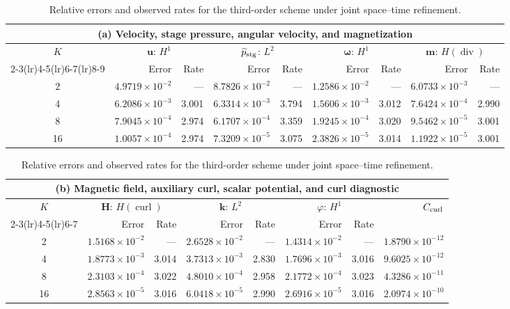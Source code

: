 \documentclass[11pt,a4paper]{article}
\newcommand{\bs}{\boldsymbol}
\DeclareMathOperator{\curl}{curl}
\DeclareMathOperator{\ddiv}{div}
\newcommand{\Div}{\ddiv}
\newcommand{\pp}{\widetilde p}
\theoremstyle{definition}
\numberwithin{equation}{section}
\begin{document}
\begin{table}[H]
\centering
\caption{Relative errors and observed rates for the third-order scheme under joint space--time refinement.}
\label{tab:third-order-errors}
\begingroup
\small
\setlength{\tabcolsep}{3.5pt}
\renewcommand{\arraystretch}{1.10}
\begin{tabular}{@{}c*{8}{r}@{}}
\toprule
\multicolumn{9}{c}{(a) Velocity, stage pressure, angular velocity, and magnetization}\\
\midrule
$K$ & \multicolumn{2}{c}{$\bs u$: $H^1$} & \multicolumn{2}{c}{$\pp_{\rm stg}$: $L^2$} & \multicolumn{2}{c}{$\bs\omega$: $H^1$} & \multicolumn{2}{c}{$\bs m$: $H(\Div)$}\\
\cmidrule(lr){2-3}\cmidrule(lr){4-5}\cmidrule(lr){6-7}\cmidrule(lr){8-9}
 & Error & Rate & Error & Rate & Error & Rate & Error & Rate\\
\midrule
2 & $4.9719\!\times\!10^{-2}$ & --- & $8.7826\!\times\!10^{-2}$ & --- & $1.2586\!\times\!10^{-2}$ & --- & $6.0733\!\times\!10^{-3}$ & ---\\
4 & $6.2086\!\times\!10^{-3}$ & 3.001 & $6.3314\!\times\!10^{-3}$ & 3.794 & $1.5606\!\times\!10^{-3}$ & 3.012 & $7.6424\!\times\!10^{-4}$ & 2.990\\
8 & $7.9045\!\times\!10^{-4}$ & 2.974 & $6.1707\!\times\!10^{-4}$ & 3.359 & $1.9245\!\times\!10^{-4}$ & 3.020 & $9.5462\!\times\!10^{-5}$ & 3.001\\
16 & $1.0057\!\times\!10^{-4}$ & 2.974 & $7.3209\!\times\!10^{-5}$ & 3.075 & $2.3826\!\times\!10^{-5}$ & 3.014 & $1.1922\!\times\!10^{-5}$ & 3.001\\
\bottomrule
\end{tabular}
\par\medskip
\begin{tabular}{@{}c*{7}{r}@{}}
\toprule
\multicolumn{8}{c}{(b) Magnetic field, auxiliary curl, scalar potential, and curl diagnostic}\\
\midrule
$K$ & \multicolumn{2}{c}{$\bs H$: $H(\curl)$} & \multicolumn{2}{c}{$\bs k$: $L^2$} & \multicolumn{2}{c}{$\varphi$: $H^1$} & $C_{\rm curl}$\\
\cmidrule(lr){2-3}\cmidrule(lr){4-5}\cmidrule(lr){6-7}
 & Error & Rate & Error & Rate & Error & Rate & \\
\midrule
2 & $1.5168\!\times\!10^{-2}$ & --- & $2.6528\!\times\!10^{-2}$ & --- & $1.4314\!\times\!10^{-2}$ & --- & $1.8790\!\times\!10^{-12}$\\
4 & $1.8773\!\times\!10^{-3}$ & 3.014 & $3.7313\!\times\!10^{-3}$ & 2.830 & $1.7696\!\times\!10^{-3}$ & 3.016 & $9.6025\!\times\!10^{-12}$\\
8 & $2.3103\!\times\!10^{-4}$ & 3.022 & $4.8010\!\times\!10^{-4}$ & 2.958 & $2.1772\!\times\!10^{-4}$ & 3.023 & $4.3286\!\times\!10^{-11}$\\
16 & $2.8563\!\times\!10^{-5}$ & 3.016 & $6.0418\!\times\!10^{-5}$ & 2.990 & $2.6916\!\times\!10^{-5}$ & 3.016 & $2.0974\!\times\!10^{-10}$\\
\bottomrule
\end{tabular}
\endgroup
\end{table}
\end{document}
